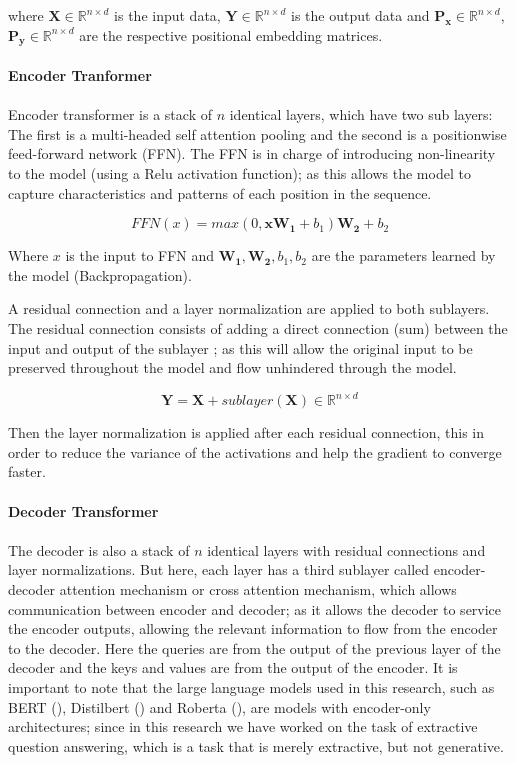 where $\mathbf{X} \in \mathbb{R}^{n \times d}$ is the input data, $\mathbf{Y} \in \mathbb{R}^{n \times d}$
is the output data and $\mathbf{P_{x}}  \in \mathbb{R}^{n \times d}$, $\mathbf{P_{y}}  \in \mathbb{R}^{n \times d}$ are the respective positional embedding matrices.
\\\\
\textbf{Encoder Tranformer}
\\\\
Encoder transformer is a stack of $n$ identical layers, which have two sub layers: The first is a multi-headed self attention pooling and the second is a positionwise feed-forward network (FFN). The FFN is in charge of introducing non-linearity to the model (using a Relu activation function); as this allows the model to capture characteristics and patterns of each position in the sequence.

\begin{equation}
    FFN(x)=max(0,\mathbf{x}\mathbf{W_{1}}+b_{1})\mathbf{W_{2}}+b_{2}
\end{equation}

Where $x$ is the input to FFN and $\mathbf{W_{1}}, \mathbf{W_{2}},b_{1}, b_{2}$ are the parameters learned by the model (Backpropagation).

A residual connection and a layer normalization are applied to both sublayers. The residual connection consists of adding a direct connection (sum) between the input and output of the sublayer ; as this will allow the original input to be preserved throughout the model and flow unhindered through the model.

\begin{equation}
    \mathbf{Y} = \mathbf{X}+sublayer(\mathbf{X}) \in \mathbb{R}^{n \times d}
\end{equation}

Then the layer normalization is applied after each residual connection, this in order to reduce the variance of the activations and help the gradient to converge faster.
\\\\
\textbf{Decoder Transformer}
\\\\
The decoder is also a stack of $n$ identical layers with residual connections and layer normalizations. But here, each layer has a third sublayer called encoder-decoder attention mechanism or cross attention mechanism, which allows communication between encoder and decoder; as it allows the decoder to service the encoder outputs, allowing the relevant information to flow from the encoder to the decoder. Here the queries are from the output of the previous layer of the decoder and the keys and values are from the output of the encoder. 
\newpage
It is important to note that the large language models used in this research, such as BERT (\cite{devlin2018bert}), Distilbert (\cite{sanh2019distilbert}) and Roberta (\cite{liu2019roberta}), are models with encoder-only architectures; since in this research we have worked on the task of extractive question answering, which is a task that is merely extractive, but not generative.